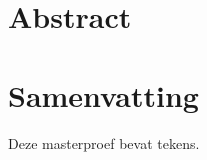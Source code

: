 
\begingroup
\let\clearpage\relax
\let\cleardoublepage\relax
\let\cleardoublepage\relax

\chapter*{Abstract}

\vfill

\chapter*{Samenvatting}
Deze masterproef bevat \textbf{} tekens.

\endgroup			

\vfill

